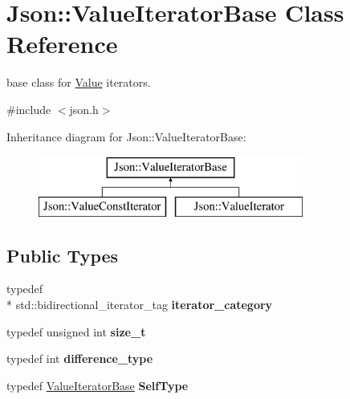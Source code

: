\hypertarget{class_json_1_1_value_iterator_base}{\section{Json\+:\+:Value\+Iterator\+Base Class Reference}
\label{class_json_1_1_value_iterator_base}
}


base class for \hyperlink{class_json_1_1_value}{Value} iterators.  




{\ttfamily \#include $<$json.\+h$>$}

Inheritance diagram for Json\+:\+:Value\+Iterator\+Base\+:\begin{figure}[H]
\begin{center}
\leavevmode
\includegraphics[height=2.000000cm]{class_json_1_1_value_iterator_base}
\end{center}
\end{figure}
\subsection*{Public Types}
\begin{DoxyCompactItemize}
\item 
\hypertarget{class_json_1_1_value_iterator_base_a02fd11a4fbdc0007da1e8bcf5e6b83c3}{typedef \\*
std\+::bidirectional\+\_\+iterator\+\_\+tag {\bfseries iterator\+\_\+category}}\label{class_json_1_1_value_iterator_base_a02fd11a4fbdc0007da1e8bcf5e6b83c3}

\item 
\hypertarget{class_json_1_1_value_iterator_base_a9d3a3c7ce5cdefe23cb486239cf07bb5}{typedef unsigned int {\bfseries size\+\_\+t}}\label{class_json_1_1_value_iterator_base_a9d3a3c7ce5cdefe23cb486239cf07bb5}

\item 
\hypertarget{class_json_1_1_value_iterator_base_a4e44bf8cbd17ec8d6e2c185904a15ebd}{typedef int {\bfseries difference\+\_\+type}}\label{class_json_1_1_value_iterator_base_a4e44bf8cbd17ec8d6e2c185904a15ebd}

\item 
\hypertarget{class_json_1_1_value_iterator_base_a9d2a940d03ea06d20d972f41a89149ee}{typedef \hyperlink{class_json_1_1_value_iterator_base}{Value\+Iterator\+Base} {\bfseries Self\+Type}}\label{class_json_1_1_value_iterator_base_a9d2a940d03ea06d20d972f41a89149ee}

\end{DoxyCompactItemize}
